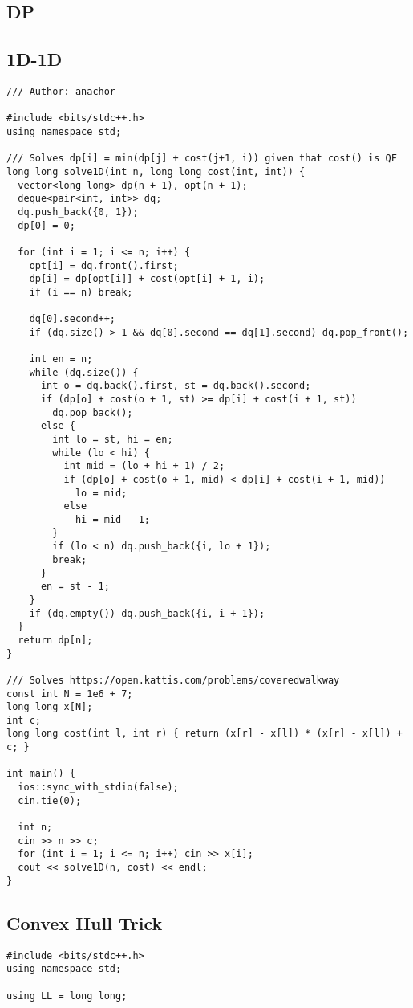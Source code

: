 \documentclass[FSZ,a4paper,onesided]{article}
\begin{document}
\begin{multicols*}{\COLS}
\section{DP}
\subsection{1D-1D}
\begin{lstlisting}
/// Author: anachor

#include <bits/stdc++.h>
using namespace std;

/// Solves dp[i] = min(dp[j] + cost(j+1, i)) given that cost() is QF
long long solve1D(int n, long long cost(int, int)) {
  vector<long long> dp(n + 1), opt(n + 1);
  deque<pair<int, int>> dq;
  dq.push_back({0, 1});
  dp[0] = 0;

  for (int i = 1; i <= n; i++) {
    opt[i] = dq.front().first;
    dp[i] = dp[opt[i]] + cost(opt[i] + 1, i);
    if (i == n) break;

    dq[0].second++;
    if (dq.size() > 1 && dq[0].second == dq[1].second) dq.pop_front();

    int en = n;
    while (dq.size()) {
      int o = dq.back().first, st = dq.back().second;
      if (dp[o] + cost(o + 1, st) >= dp[i] + cost(i + 1, st))
        dq.pop_back();
      else {
        int lo = st, hi = en;
        while (lo < hi) {
          int mid = (lo + hi + 1) / 2;
          if (dp[o] + cost(o + 1, mid) < dp[i] + cost(i + 1, mid))
            lo = mid;
          else
            hi = mid - 1;
        }
        if (lo < n) dq.push_back({i, lo + 1});
        break;
      }
      en = st - 1;
    }
    if (dq.empty()) dq.push_back({i, i + 1});
  }
  return dp[n];
}

/// Solves https://open.kattis.com/problems/coveredwalkway
const int N = 1e6 + 7;
long long x[N];
int c;
long long cost(int l, int r) { return (x[r] - x[l]) * (x[r] - x[l]) + c; }

int main() {
  ios::sync_with_stdio(false);
  cin.tie(0);

  int n;
  cin >> n >> c;
  for (int i = 1; i <= n; i++) cin >> x[i];
  cout << solve1D(n, cost) << endl;
}
\end{lstlisting}
\subsection{Convex Hull Trick}
\begin{lstlisting}
#include <bits/stdc++.h>
using namespace std;

using LL = long long;


\end{lstlisting}
\end{multicols*}
\end{document}

